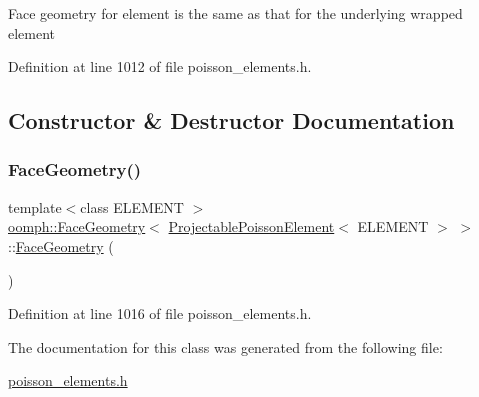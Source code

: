 Face geometry for element is the same as that for the underlying wrapped element 

Definition at line 1012 of file poisson\+\_\+elements.\+h.



\subsection{Constructor \& Destructor Documentation}
\mbox{\label{classoomph_1_1FaceGeometry_3_01ProjectablePoissonElement_3_01ELEMENT_01_4_01_4_aa5469f0278a5a7e8c474220abeae3ff4}} 
\subsubsection{\texorpdfstring{Face\+Geometry()}{FaceGeometry()}}
{\footnotesize\ttfamily template$<$class E\+L\+E\+M\+E\+NT $>$ \\
\hyperlink{classoomph_1_1FaceGeometry}{oomph\+::\+Face\+Geometry}$<$ \hyperlink{classoomph_1_1ProjectablePoissonElement}{Projectable\+Poisson\+Element}$<$ E\+L\+E\+M\+E\+NT $>$ $>$\+::\hyperlink{classoomph_1_1FaceGeometry}{Face\+Geometry} (\begin{DoxyParamCaption}{ }\end{DoxyParamCaption})\hspace{0.3cm}{\ttfamily [inline]}}



Definition at line 1016 of file poisson\+\_\+elements.\+h.



The documentation for this class was generated from the following file\+:\begin{DoxyCompactItemize}
\item 
\hyperlink{poisson__elements_8h}{poisson\+\_\+elements.\+h}\end{DoxyCompactItemize}
